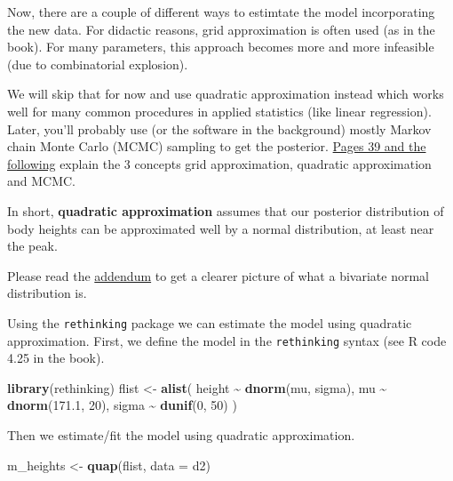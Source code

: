 \documentclass[
]{book}
\newenvironment{Shaded}{\begin{snugshade}}{\end{snugshade}}
\newcommand{\AttributeTok}[1]{\textcolor[rgb]{0.13,0.29,0.53}{#1}}
\newcommand{\DecValTok}[1]{\textcolor[rgb]{0.00,0.00,0.81}{#1}}
\newcommand{\FloatTok}[1]{\textcolor[rgb]{0.00,0.00,0.81}{#1}}
\newcommand{\FunctionTok}[1]{\textcolor[rgb]{0.13,0.29,0.53}{\textbf{#1}}}
\newcommand{\NormalTok}[1]{#1}
\newcommand{\OtherTok}[1]{\textcolor[rgb]{0.56,0.35,0.01}{#1}}
\newcommand{\SpecialCharTok}[1]{\textcolor[rgb]{0.81,0.36,0.00}{\textbf{#1}}}
\begin{document}
Now, there are a couple of different ways to estimtate the model incorporating
the new data. For didactic reasons, grid approximation is often used (as in the book).
For many parameters, this approach becomes more and more infeasible (due to combinatorial explosion).

We will skip that for now and use quadratic approximation instead which
works well for many common procedures in applied statistics (like linear regression).
Later, you'll probably use (or the software in the background) mostly Markov
chain Monte Carlo (MCMC) sampling to get the posterior.
\href{https://civil.colorado.edu/~balajir/CVEN6833/bayes-resources/RM-StatRethink-Bayes.pdf}{Pages 39 and the following}
explain the 3 concepts grid approximation, quadratic approximation and MCMC.

In short, \textbf{quadratic approximation} assumes that our posterior distribution
of body heights can be approximated well by a normal distribution,
at least near the peak.

Please read the \hyperref[bivariate_normal]{addendum} to get a clearer picture of
what a bivariate normal distribution is.

Using the \texttt{rethinking} package we can estimate the model using quadratic approximation.
First, we define the model in the \texttt{rethinking} syntax (see R code 4.25 in the book).

\begin{Shaded}
\begin{Highlighting}[]
\FunctionTok{library}\NormalTok{(rethinking)}
\NormalTok{flist }\OtherTok{\textless{}{-}} \FunctionTok{alist}\NormalTok{(}
\NormalTok{  height }\SpecialCharTok{\textasciitilde{}} \FunctionTok{dnorm}\NormalTok{(mu, sigma),}
\NormalTok{  mu }\SpecialCharTok{\textasciitilde{}} \FunctionTok{dnorm}\NormalTok{(}\FloatTok{171.1}\NormalTok{, }\DecValTok{20}\NormalTok{),}
\NormalTok{  sigma }\SpecialCharTok{\textasciitilde{}} \FunctionTok{dunif}\NormalTok{(}\DecValTok{0}\NormalTok{, }\DecValTok{50}\NormalTok{)}
\NormalTok{)}
\end{Highlighting}
\end{Shaded}

Then we estimate/fit the model using quadratic approximation.

\begin{Shaded}
\begin{Highlighting}[]
\NormalTok{m\_heights }\OtherTok{\textless{}{-}} \FunctionTok{quap}\NormalTok{(flist, }\AttributeTok{data =}\NormalTok{ d2)}
\end{Highlighting}
\end{Shaded}
\end{document}
